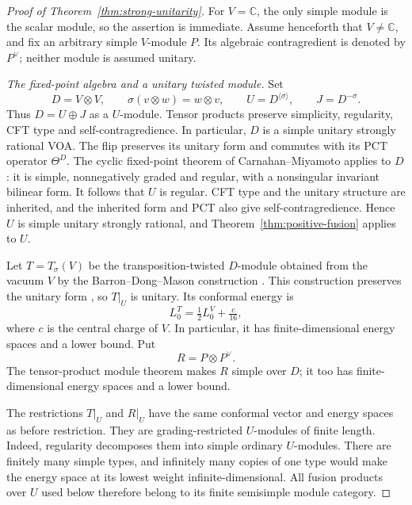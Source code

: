 \begin{proof}[Proof of Theorem~\ref{thm:strong-unitarity}]
For $V=\mathbb C$, the only simple module is the scalar module, so the
assertion is immediate. Assume henceforth that $V\ne\mathbb C$, and fix
an arbitrary simple $V$-module $P$. Its algebraic contragredient is
denoted by $P^\vee$; neither module is assumed unitary.

\smallskip
\noindent\emph{The fixed-point algebra and a unitary twisted module.}
Set
\[
 D=V\otimes V,\qquad
 \sigma(v\otimes w)=w\otimes v,\qquad
 U=D^{\langle\sigma\rangle},\qquad J=D^{-\sigma}.
\]
Thus $D=U\oplus J$ as a $U$-module. Tensor products preserve simplicity,
regularity, CFT type and self-contragredience. In particular, $D$ is a
simple unitary strongly rational VOA. The flip preserves its unitary
form and commutes with its PCT operator $\Theta^D$. The cyclic
fixed-point theorem of Carnahan--Miyamoto
\cite[Corollary~5.25]{CarnahanMiyamoto} applies to $D$: it is simple,
nonnegatively graded and regular, with a nonsingular invariant bilinear
form. It follows that $U$ is regular. CFT type and the unitary structure
are inherited, and the inherited form and PCT also give
self-contragredience. Hence $U$ is simple unitary strongly rational,
and Theorem~\ref{thm:positive-fusion} applies to $U$.

Let $T=T_\sigma(V)$ be the transposition-twisted $D$-module obtained from
the vacuum $V$ by the Barron--Dong--Mason construction
\cite[Theorem~3.9]{BDM}. This construction preserves the unitary form
\cite[Lemma~10.12]{GuiPositivity}, so $T|_U$ is unitary. Its conformal
energy is
\[
 L_0^T=\tfrac12 L_0^V+\tfrac{c}{16},
\]
where $c$ is the central charge of $V$. In particular, it has
finite-dimensional energy spaces and a lower bound. Put
\[
 R=P\otimes P^\vee.
\]
The tensor-product module theorem makes $R$ simple over $D$; it too has
finite-dimensional energy spaces and a lower bound.

The restrictions $T|_U$ and $R|_U$ have the same conformal vector and
energy spaces as before restriction. They are grading-restricted
$U$-modules of finite length. Indeed, regularity decomposes them into
simple ordinary $U$-modules. There are finitely many simple types, and
infinitely many copies of one type would make the energy space at its
lowest weight infinite-dimensional. All fusion products over $U$ used
below therefore belong to its finite semisimple module category.


\end{proof}
